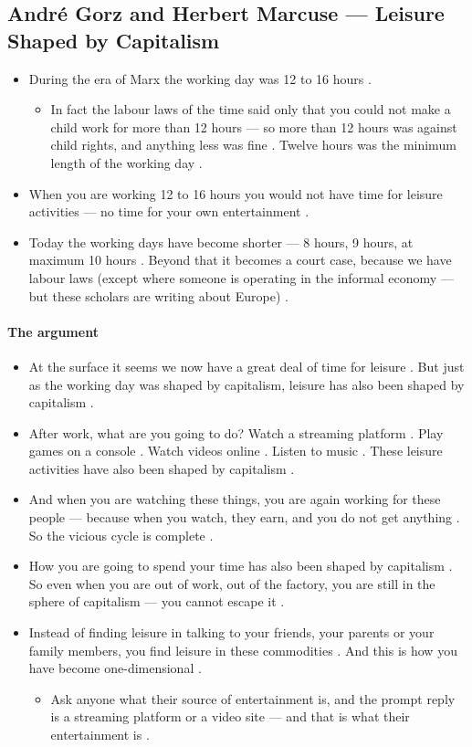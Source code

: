 \subsection{Andr\'e Gorz and Herbert Marcuse --- Leisure Shaped by Capitalism}
\begin{itemize}
    \item During the era of Marx the working day was 12 to 16 hours .
    \begin{itemize}
        \item In fact the labour laws of the time said only that you could not make a child work for more than 12 hours --- so more than 12 hours was against child rights, and anything less was fine . Twelve hours was the minimum length of the working day .
    \end{itemize}
    \item When you are working 12 to 16 hours you would not have time for leisure activities --- no time for your own entertainment .
    \item Today the working days have become shorter --- 8 hours, 9 hours, at maximum 10 hours . Beyond that it becomes a court case, because we have labour laws (except where someone is operating in the informal economy --- but these scholars are writing about Europe) .
\end{itemize}

\paragraph{The argument}
\begin{itemize}
    \item At the surface it seems we now have a great deal of time for leisure . But just as the working day was shaped by capitalism, leisure has also been shaped by capitalism .
    \item After work, what are you going to do? Watch a streaming platform . Play games on a console . Watch videos online . Listen to music . These leisure activities have also been shaped by capitalism .
    \item And when you are watching these things, you are again working for these people --- because when you watch, they earn, and you do not get anything . So the vicious cycle is complete .
    \item How you are going to spend your time has also been shaped by capitalism . So even when you are out of work, out of the factory, you are still in the sphere of capitalism --- you cannot escape it .
    \item Instead of finding leisure in talking to your friends, your parents or your family members, you find leisure in these commodities . And this is how you have become one-dimensional .
    \begin{itemize}
        \item Ask anyone what their source of entertainment is, and the prompt reply is a streaming platform or a video site --- and that is what their entertainment is .
    \end{itemize}
\end{itemize}

